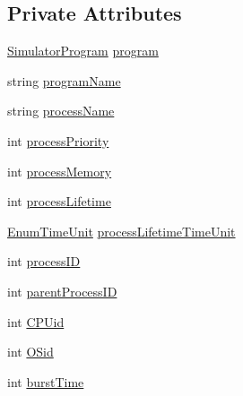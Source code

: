 \subsection*{Private Attributes}
\begin{DoxyCompactItemize}
\item 
\hyperlink{class_c_p_u___o_s___simulator_1_1_c_p_u_1_1_simulator_program}{Simulator\+Program} \hyperlink{class_c_p_u___o_s___simulator_1_1_operating___system_1_1_simulator_process_aed4dc26a67cf9f15930f22941484219a}{program}
\item 
string \hyperlink{class_c_p_u___o_s___simulator_1_1_operating___system_1_1_simulator_process_aacd55b65bf86395ae3c1a446d580030e}{program\+Name}
\item 
string \hyperlink{class_c_p_u___o_s___simulator_1_1_operating___system_1_1_simulator_process_a6d29b67977f07ebb1b6336b96960752b}{process\+Name}
\item 
int \hyperlink{class_c_p_u___o_s___simulator_1_1_operating___system_1_1_simulator_process_a122acf698432625719c9ddd0152aab0d}{process\+Priority}
\item 
int \hyperlink{class_c_p_u___o_s___simulator_1_1_operating___system_1_1_simulator_process_af574b021e490c03ed55332ee0ed4c067}{process\+Memory}
\item 
int \hyperlink{class_c_p_u___o_s___simulator_1_1_operating___system_1_1_simulator_process_aa70f97b2b63f49ded3d505d104a1f3d9}{process\+Lifetime}
\item 
\hyperlink{namespace_c_p_u___o_s___simulator_1_1_operating___system_a0553d0bc2513aec52caa769acf994d5c}{Enum\+Time\+Unit} \hyperlink{class_c_p_u___o_s___simulator_1_1_operating___system_1_1_simulator_process_a53aad888e888ff8f9a3999047f14d362}{process\+Lifetime\+Time\+Unit}
\item 
int \hyperlink{class_c_p_u___o_s___simulator_1_1_operating___system_1_1_simulator_process_a1dc38ec3dc556cacd6de21a0ecd5e440}{process\+I\+D}
\item 
int \hyperlink{class_c_p_u___o_s___simulator_1_1_operating___system_1_1_simulator_process_af7c5460498b8fc188df0d4c12b62c15b}{parent\+Process\+I\+D}
\item 
int \hyperlink{class_c_p_u___o_s___simulator_1_1_operating___system_1_1_simulator_process_ae26fd9d2bdc4dc5012260c39f289d4de}{C\+P\+Uid}
\item 
int \hyperlink{class_c_p_u___o_s___simulator_1_1_operating___system_1_1_simulator_process_a1b124e6b0a70221c4739a78d81c89aaf}{O\+Sid}
\item 
int \hyperlink{class_c_p_u___o_s___simulator_1_1_operating___system_1_1_simulator_process_aaa8160807178efd2cb70364dc48a8c70}{burst\+Time}

\end{DoxyCompactItemize}
